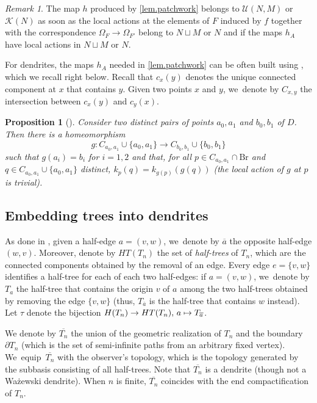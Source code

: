 \documentclass[JEP,XML,SOM,Unicode,NoFloatCountersInSection,published]{cedram}
\newcommand\mto{\mathchoice{\longmapsto}{\mapsto}{\mapsto}{\mapsto}}
\theoremstyle{plain}
\newtheorem{proposition}[theorem]{Proposition}
\theoremstyle{definition}
\theoremstyle{remark}
\newtheorem{remark}[theorem]{Remark}
\newcommand{\U}{\mathcal{U}}
\newcommand{\K}{\mathcal{K}}
\newcommand{\Br}{\mathrm{Br}}
\begin{document}
\begin{remark}
\label{rmk.patchwork.coloring}
The map $h$ produced by \cref{lem.patchwork} belongs to $\U(N,M)$ or $\K(N)$ as soon as the local actions at the elements of $F$ induced by $f$ together with the correspondence $\Omega_F \to \Omega_{F'}$ belong to $N \sqcup M$ or $N$ and if the maps $h_A$ have local actions in $N \sqcup M$ or $N$.
\end{remark}

For dendrites, the maps $h_A$ needed in \cref{lem.patchwork} can be often built using \cite[Cor.\,4.5]{Kaleidoscopic}, which we recall right below.
Recall that $c_x(y)$ denotes the unique connected component at $x$ that contains $y$.
Given two points $x$ and $y$, we~denote by $C_{x,y}$ the intersection between $c_x(y)$ and $c_y(x)$.

\begin{proposition}[{\cite[Cor.\,4.5]{Kaleidoscopic}}]
\label{prop.partial.dendrite.homeomorphism}
Consider two distinct pairs of points $a_0, a_1$ and $b_0, b_1$ of $D$.
Then there is a homeomorphism
\[
 g \colon C_{a_0,a_1} \cup \{a_0,a_1\} \to C_{b_0,b_1} \cup \{b_0,b_1\} 
\]
such that $g(a_i)\!=\!b_i$ for $i\!=\!1,2$ and that, for all $p \!\in\! C_{a_0,a_1} \cap \Br$ and $q \!\in\! C_{a_0,a_1} \cup \{a_0,a_1\}$ distinct, $k_p(q) = k_{g(p)}(g(q))$ (\ie the local action of $g$ at $p$ is trivial).
\end{proposition}

\subsection{Embedding trees into dendrites}

As done in \cite{biregular}, given a half-edge $a=(v,w)$, we~denote by $\overline{a}$ the opposite half-edge $(w,v)$.
Moreover, denote by $HT(T_n)$ the set of \emph{half-trees} of $T_n$, which are the connected components obtained by the removal of an edge.
Every edge $e = \{v,w\}$ identifies a half-tree for each of each two half-edges:
if $a=(v,w)$, we~denote by $T_a$ the half-tree that contains the origin $v$ of $a$ among the two half-trees obtained by removing the edge $\{v,w\}$ (thus, $T_{\overline{a}}$ is the half-tree that contains $w$ instead).
Let $\tau$ denote the bijection $H(T_n) \to HT(T_n),\, a \mto T_{\overline{a}}$.

We denote by $\overline{T_n}$ the union of the geometric realization of $T_n$ and the boundary~$\partial T_n$ (which is the set of semi-infinite paths from an arbitrary fixed vertex). We~equip~$\overline{T_n}$ with the observer's topology, which is the topology generated by the subbasis consisting of all half-trees.
Note that $\overline{T_n}$ is a dendrite (though not a Ważewski dendrite).
When $n$ is finite, $\overline{T_n}$ coincides with the end compactification of $T_n$.
\end{document}
